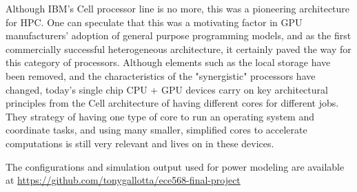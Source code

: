 \documentclass{sig-alternate-05-2015}
\begin{document}
Although IBM's Cell processor line is no more, this was a pioneering architecture for HPC. One can speculate that this was a motivating factor in GPU manufacturers' adoption of general purpose programming models, and as the first commercially successful heterogeneous architecture, it certainly paved the way for this category of processors. Although elements such as the local storage have been removed, and the characteristics of the "synergistic" processors have changed, today's single chip CPU + GPU devices carry on key architectural principles from the Cell architecture of having different cores for different jobs. They strategy of having one type of core to run an operating system and coordinate tasks, and using many smaller, simplified cores to accelerate computations is still very relevant and lives on in these devices.



%
%

\appendix

The configurations and simulation output used for power modeling are available at \url{https://github.com/tonygallotta/ece568-final-project}
\end{document}
